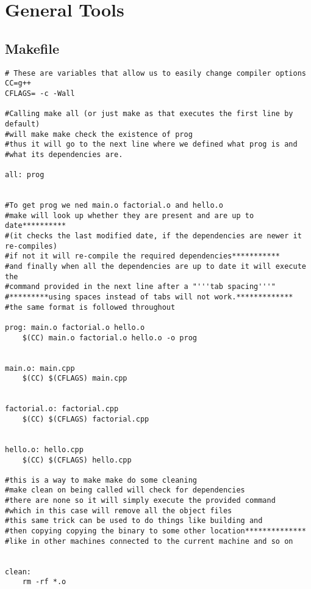 \chapter{General Tools}
\section{Makefile}



\begin{lstlisting}
# These are variables that allow us to easily change compiler options
CC=g++
CFLAGS= -c -Wall

#Calling make all (or just make as that executes the first line by default) 
#will make make check the existence of prog  
#thus it will go to the next line where we defined what prog is and 
#what its dependencies are.

all: prog


#To get prog we ned main.o factorial.o and hello.o
#make will look up whether they are present and are up to date**********
#(it checks the last modified date, if the dependencies are newer it re-compiles)
#if not it will re-compile the required dependencies***********
#and finally when all the dependencies are up to date it will execute the 
#command provided in the next line after a "'''tab spacing'''"
#*********using spaces instead of tabs will not work.*************
#the same format is followed throughout

prog: main.o factorial.o hello.o
    $(CC) main.o factorial.o hello.o -o prog
    
    
main.o: main.cpp
    $(CC) $(CFLAGS) main.cpp
    
    
factorial.o: factorial.cpp
    $(CC) $(CFLAGS) factorial.cpp
    
    
hello.o: hello.cpp
    $(CC) $(CFLAGS) hello.cpp
    
#this is a way to make make do some cleaning
#make clean on being called will check for dependencies
#there are none so it will simply execute the provided command 
#which in this case will remove all the object files
#this same trick can be used to do things like building and 
#then copying copying the binary to some other location**************
#like in other machines connected to the current machine and so on


clean:
    rm -rf *.o 
    
\end{lstlisting}
